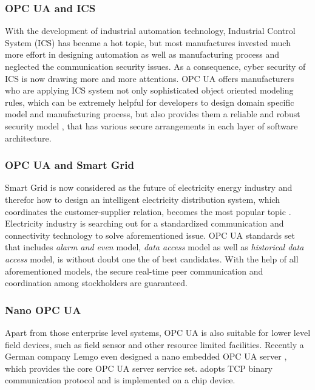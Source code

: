 \subsubsection{OPC UA and ICS}
With the development of industrial automation technology, Industrial Control System (ICS) has became a hot topic, but most manufactures invested much more effort in designing automation as well as manufacturing process and neglected the communication security issues. As a consequence, cyber security of ICS is now drawing more and more attentions. OPC UA offers manufacturers who are applying ICS system not only sophisticated object oriented modeling rules, which can be extremely helpful for developers to design domain specific model and manufacturing process, but also provides them a reliable and robust security model \cite{opc_ics}, that has various secure arrangements in each layer of software architecture.


\subsubsection{OPC UA and Smart Grid}
Smart Grid is now considered as the future of electricity energy industry and therefor how to design an intelligent electricity distribution system, which coordinates the customer-supplier relation, becomes the most popular topic \cite{opc_grid}. Electricity industry is searching out for a standardized communication and connectivity technology to solve aforementioned issue.
OPC UA standards set that includes \emph{alarm and even} model, \emph{data access} model as well as  \emph{historical data access} model, is without doubt one the of best candidates. With the help of all aforementioned models, the secure real-time peer communication and coordination among stockholders are guaranteed.

\subsubsection{Nano OPC UA }
Apart from those enterprise level systems, OPC UA is also suitable for lower level field devices, such as field sensor and other resource limited facilities. Recently a German company Lemgo even designed a nano embedded OPC UA server \cite{opc_lemgo}, which provides the core OPC UA server service set. adopts TCP binary communication protocol and is implemented on a chip device.

